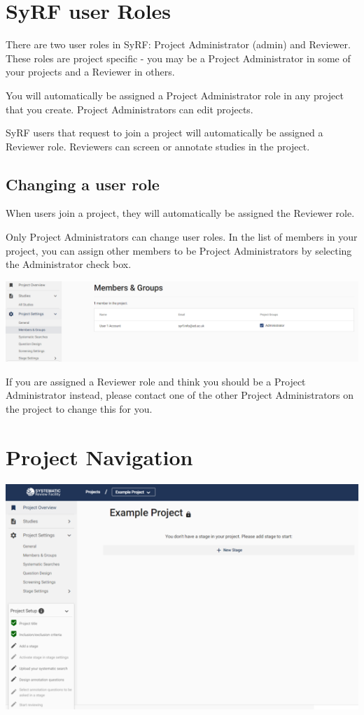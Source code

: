 \documentclass[
]{book}
\begin{document}
\hypertarget{roles}{%
\chapter{SyRF user Roles}\label{roles}}

There are two user roles in SyRF: Project Administrator (admin) and Reviewer. These roles are project specific - you may be a Project Administrator in some of your projects and a Reviewer in others.

You will automatically be assigned a Project Administrator role in any project that you create. Project Administrators can edit projects.

SyRF users that request to join a project will automatically be assigned a Reviewer role. Reviewers can screen or annotate studies in the project.

\hypertarget{changing-a-user-role}{%
\section{Changing a user role}\label{changing-a-user-role}}

When users join a project, they will automatically be assigned the Reviewer role.

Only Project Administrators can change user roles. In the list of members in your project, you can assign other members to be Project Administrators by selecting the Administrator check box.

\includegraphics[width=1\linewidth]{figs/Fig_Change_user_role}

If you are assigned a Reviewer role and think you should be a Project Administrator instead, please contact one of the other Project Administrators on the project to change this for you.

\hypertarget{nagivation}{%
\chapter{Project Navigation}\label{nagivation}}

\includegraphics[width=7.57in]{figs/Fig_Project_Nav}
\end{document}

